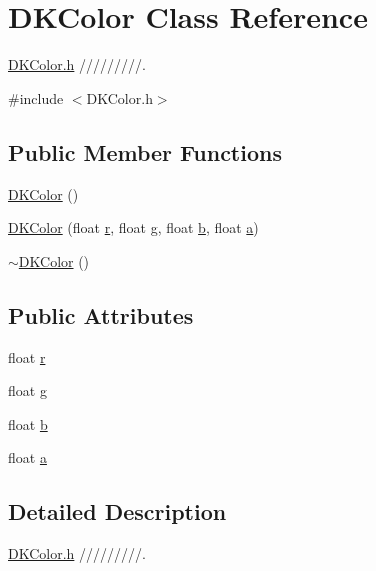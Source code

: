 \hypertarget{class_d_k_color}{\section{D\-K\-Color Class Reference}
\label{class_d_k_color}
}


\hyperlink{_d_k_color_8h}{D\-K\-Color.\-h} /////////.  




{\ttfamily \#include $<$D\-K\-Color.\-h$>$}

\subsection*{Public Member Functions}
\begin{DoxyCompactItemize}
\item 
\hyperlink{class_d_k_color_a3be2d3067144264237856c22fa49bc54}{D\-K\-Color} ()
\item 
\hyperlink{class_d_k_color_a070ad61f7a6bf36230641637918892bb}{D\-K\-Color} (float \hyperlink{class_d_k_color_a78081400c8580b6094c8b5b29190dfdf}{r}, float \hyperlink{class_d_k_color_af5bdbd995775a1095c7d402c278ce8e9}{g}, float \hyperlink{class_d_k_color_a82c302604728867019f11109076ad1b0}{b}, float \hyperlink{class_d_k_color_acdc941c9a3aeefb4ef0d80bc382e7a9b}{a})
\item 
\hyperlink{class_d_k_color_a200ee3c574fdc7b7924c45171fe7629d}{$\sim$\-D\-K\-Color} ()
\end{DoxyCompactItemize}
\subsection*{Public Attributes}
\begin{DoxyCompactItemize}
\item 
float \hyperlink{class_d_k_color_a78081400c8580b6094c8b5b29190dfdf}{r}
\item 
float \hyperlink{class_d_k_color_af5bdbd995775a1095c7d402c278ce8e9}{g}
\item 
float \hyperlink{class_d_k_color_a82c302604728867019f11109076ad1b0}{b}
\item 
float \hyperlink{class_d_k_color_acdc941c9a3aeefb4ef0d80bc382e7a9b}{a}
\end{DoxyCompactItemize}


\subsection{Detailed Description}
\hyperlink{_d_k_color_8h}{D\-K\-Color.\-h} /////////. 


